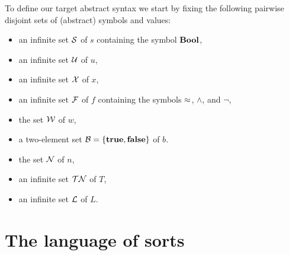 To define our target abstract syntax we start by fixing the following pairwise disjoint
sets of (abstract) symbols and values:
\begin{itemize}
\item
an infinite set $\mathcal{S}$ of  $s$ 
containing the symbol $\textbf{Bool}$,

\item
an infinite set $\mathcal{U}$ of  $u$,

\item
an infinite set $\mathcal{X}$ of  $x$,

\item
an infinite set $\mathcal{F}$ of  $f$
containing the symbols $\approx$, $\land$, and $\lnot$,



%
\item
the set $\mathcal{W}$ of  $w$,

\item
a two-element set $\mathcal{B} = \{\textbf{true}, \textbf{false}\}$ of  $b$.

\item
the set $\mathcal{N}$ of  $n$,

\item
an infinite set $\mathcal{TN}$ of  $T$,

\item
an infinite set $\mathcal{L}$ of  $L$.


\end{itemize}


\section{The language of sorts}

